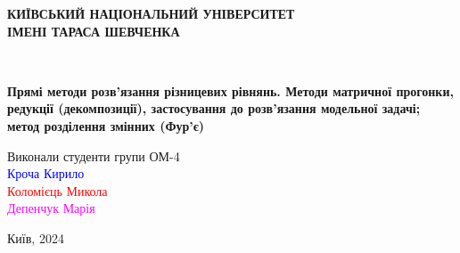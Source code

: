 \begin{titlepage}
    \begin{center}
        \large \textbf{КИЇВСЬКИЙ НАЦІОНАЛЬНИЙ УНІВЕРСИТЕТ \\
            ІМЕНІ ТАРАСА ШЕВЧЕНКА} \\

        \vspace{2.5cm}
        \vfill

        \\[2mm]

        \vfill

        {\LARGE \textbf{Прямі методи розв’язання різницевих рівнянь. 
Методи матричної прогонки, редукції (декомпозиції), застосування до розв’язання модельної задачі; 
метод розділення змінних (Фур’є)}}
        \bigskip
        \vspace{4cm}

    \end{center}
    \vfill

    \newlength{\ML}
    \settowidth{\ML}{}
    \begin{minipage}{0.5\textwidth}
        Виконали студенти групи ОМ-4 \\
        \textcolor{blue}{Кроча Кирило} \\
        \textcolor{red}{Коломієць Микола} \\
        \textcolor{magenta}{Депенчук Марія}
    \end{minipage}%
    \bigskip

    \vfill

    \vspace{2cm}

    \begin{center}
        Київ, 2024
    \end{center}

\end{titlepage}

